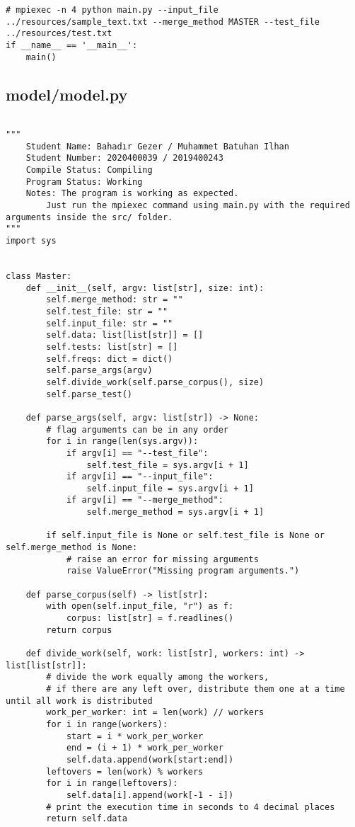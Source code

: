 \documentclass[12pt, A4, titlepage]{article}
\begin{document}
\begin{verbatim}
# mpiexec -n 4 python main.py --input_file ../resources/sample_text.txt --merge_method MASTER --test_file ../resources/test.txt
if __name__ == '__main__':
    main()
\end{verbatim}

\subsection{model/model.py}
\begin{verbatim}

"""
    Student Name: Bahadır Gezer / Muhammet Batuhan Ilhan
    Student Number: 2020400039 / 2019400243
    Compile Status: Compiling
    Program Status: Working
    Notes: The program is working as expected.
        Just run the mpiexec command using main.py with the required arguments inside the src/ folder.
"""
import sys


class Master:
    def __init__(self, argv: list[str], size: int):
        self.merge_method: str = ""
        self.test_file: str = ""
        self.input_file: str = ""
        self.data: list[list[str]] = []
        self.tests: list[str] = []
        self.freqs: dict = dict()
        self.parse_args(argv)
        self.divide_work(self.parse_corpus(), size)
        self.parse_test()

    def parse_args(self, argv: list[str]) -> None:
        # flag arguments can be in any order
        for i in range(len(sys.argv)):
            if argv[i] == "--test_file":
                self.test_file = sys.argv[i + 1]
            if argv[i] == "--input_file":
                self.input_file = sys.argv[i + 1]
            if argv[i] == "--merge_method":
                self.merge_method = sys.argv[i + 1]

        if self.input_file is None or self.test_file is None or self.merge_method is None:
            # raise an error for missing arguments
            raise ValueError("Missing program arguments.")

    def parse_corpus(self) -> list[str]:
        with open(self.input_file, "r") as f:
            corpus: list[str] = f.readlines()
        return corpus

    def divide_work(self, work: list[str], workers: int) -> list[list[str]]:
        # divide the work equally among the workers,
        # if there are any left over, distribute them one at a time until all work is distributed
        work_per_worker: int = len(work) // workers
        for i in range(workers):
            start = i * work_per_worker
            end = (i + 1) * work_per_worker
            self.data.append(work[start:end])
        leftovers = len(work) % workers
        for i in range(leftovers):
            self.data[i].append(work[-1 - i])
        # print the execution time in seconds to 4 decimal places
        return self.data


\end{verbatim}
\end{document}
